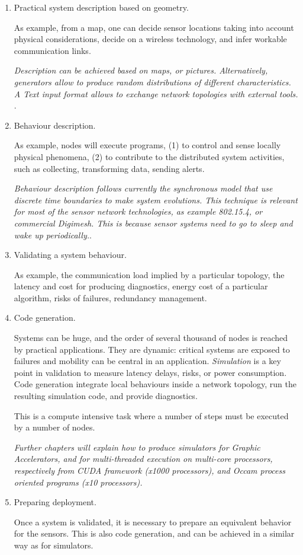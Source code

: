 \documentclass[times,a4paper]{book}
\begin{document}
\begin{enumerate}
\item Practical system description based on geometry.

As example, from a map, one can decide sensor locations taking into account physical considerations, decide
on a wireless technology, and infer workable communication links.

{\sl Description can be achieved based on maps, or pictures. Alternatively, generators allow to produce 
random distributions of different characteristics. A Text input format allows to exchange network topologies with external tools. }.

\item Behaviour description.

As example, nodes will execute programs, (1) to control and sense  locally  physical phenomena, (2) 
to  contribute to the distributed system activities, such as collecting, transforming  data, sending alerts.


{\sl Behaviour description follows currently the synchronous model that use discrete time boundaries 
to make system evolutions. This technique is relevant for most of the sensor network technologies, 
as example 802.15.4, or commercial Digimesh. This is because sensor systems need to go to sleep
and wake up periodically.}.


\item Validating a system behaviour.

As example, the communication load implied by a particular topology, the latency and cost for producing
diagnostics, energy cost of a particular algorithm, risks of failures, redundancy management.

 
\item Code generation.

Systems can be huge, and the order of several thousand of nodes is reached by practical applications.
They are dynamic: critical systems are exposed to failures and mobility can be central in an application.
{\sl Simulation } is a key point in validation to measure latency delays, risks, or power consumption.
Code generation integrate local behaviours inside a network topology,   run the resulting simulation code, 
and provide diagnostics.

This is a compute intensive task where a number of steps must be executed by a number of nodes.

{\sl 
Further chapters will explain how to produce simulators for Graphic Accelerators, and for multi-threaded
execution on multi-core processors, respectively from CUDA framework (x1000 processors), and
Occam process oriented programs (x10 processors).}

\item Preparing deployment.

Once a system is validated, it is necessary to prepare an  equivalent behavior for the sensors. This is also
code generation, and can be achieved in a similar way as for simulators.
\end{enumerate}
\end{document}
